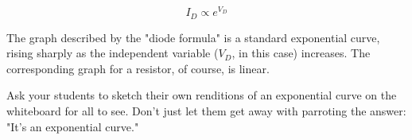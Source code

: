 $$I_D \propto e^{V_D}$$

The graph described by the "diode formula" is a standard exponential curve, rising sharply as the independent variable ($V_D$, in this case) increases.  The corresponding graph for a resistor, of course, is linear.







Ask your students to sketch their own renditions of an exponential curve on the whiteboard for all to see.  Don't just let them get away with parroting the answer: "It's an exponential curve."




